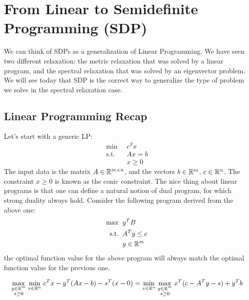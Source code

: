 \documentclass[11pt]{article}
\begin{document}

\section*{From Linear to Semidefinite Programming (SDP)}
We can think of SDPs as a generalization of Linear Programming. We have seen two different relaxation: the metric relaxation that was solved by a linear program, and the spectral relaxation that was solved by an eigenvector problem. We will see today that SDP is the correct way to generalize the type of problem we solve in the spectral relaxation case.

\subsection*{Linear Programming Recap}

Let's start with a generic LP:
\begin{align*}
    \min \;&\; c^Tx\\
    \text{s.t.} \;& \;Ax = b\\
    & \;x \geq 0
\end{align*}
The input data is the matrix $A \in \mathbb{R}^{m \times n}$, and the vectors $b\in \mathbb{R}^m$, $c \in \mathbb{R}^n$. The constraint $x \geq 0$ is known as the conic constraint. The nice thing about linear programs is that one can define a natural notion of dual program, for which strong duality always hold. Consider the following program derived from the above one:
\begin{align*}
    \max \;&\; y^TB\\
    \text{s.t.} \; & \; A^Ty \leq c\\
    & \; y \in \mathbb{R}^m
\end{align*}
the optimal function value for the above program will always match the optimal function value for the previous one.

\begin{align*}
    \underset{\substack{y \in \mathbb{R}^m\\ s\geq 0}}{\max}\;\underset{x\in \mathbb{R}^n}{\min}\; c^Tx - y^T(Ax-b) - s^T(x-0) = \underset{x\in \mathbb{R}^n}{\min}\;\underset{\substack{y \in \mathbb{R}^m\\ s\geq 0}}{\max}\; x^T( c - A^Ty - s) +y^Tb
\end{align*}
\end{document}

